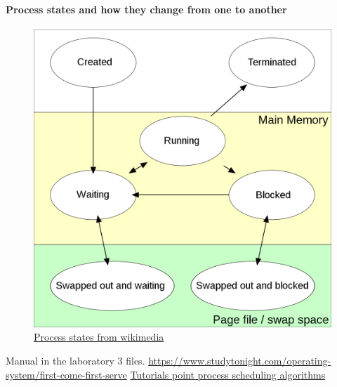 \documentclass{article}
\begin{document}
\paragraph{Process states and how they change from one to another}
\begin{figure}
	\caption{\href{https://commons.wikimedia.org/wiki/File:Process_states.svg}{Process states from wikimedia}}
	\includegraphics[width=\textwidth]{procestates}
\end{figure}

\begin{thebibliography}{9}
	 Manual in the laboratory 3 files.
	\href{https://www.studytonight.com/operating-system/first-come-first-serve}{https://www.studytonight.com/operating-system/first-come-first-serve}
	\href{https://www.tutorialspoint.com/operating_system/os_process_scheduling_algorithms.htm}{Tutorials
	point process scheduling algorithms}
\end{thebibliography}
\end{document}
